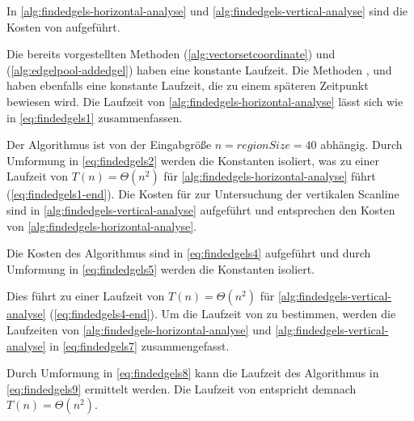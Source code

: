 In \autoref{alg:findedgels-horizontal-analyse} und \autoref{alg:findedgels-vertical-analyse} sind die Kosten von
  aufgeführt.

Die bereits vorgestellten Methoden  (\autoref{alg:vectorsetcoordinate}) und
  (\autoref{alg:edgelpool-addedgel}) haben eine konstante Laufzeit. Die Methoden
 ,  und  haben ebenfalls eine
 konstante Laufzeit, die zu einem späteren Zeitpunkt bewiesen wird.  Die Laufzeit von
 \autoref{alg:findedgels-horizontal-analyse} lässt sich wie in \autoref{eq:findedgels1} zusammenfassen.

Der Algorithmus ist von der Eingabgröße $n = \mathit{regionSize} = 40$ abhängig. Durch Umformung in \autoref{eq:findedgels2} werden die Konstanten isoliert, was zu einer Laufzeit von $T(n) = \Theta(n^2)$ für \autoref{alg:findedgels-horizontal-analyse}
 führt (\autoref{eq:findedgels1-end}). Die Kosten für  zur Untersuchung der vertikalen Scanline
 sind in \autoref{alg:findedgels-vertical-analyse} aufgeführt und entsprechen den Kosten von
 \autoref{alg:findedgels-horizontal-analyse}.

Die Kosten des Algorithmus sind in \autoref{eq:findedgels4} aufgeführt und durch Umformung in \autoref{eq:findedgels5}
 werden die Konstanten isoliert.

Dies führt zu einer Laufzeit von $T(n) = \Theta(n^2)$ für \autoref{alg:findedgels-vertical-analyse}
 (\autoref{eq:findedgels4-end}).
Um die Laufzeit von  zu bestimmen, werden die Laufzeiten von
 \autoref{alg:findedgels-horizontal-analyse} und \autoref{alg:findedgels-vertical-analyse} in \autoref{eq:findedgels7}
 zusammengefasst.

Durch Umformung in \autoref{eq:findedgels8} kann die Laufzeit des Algorithmus in \autoref{eq:findedgels9} ermittelt
 werden. Die Laufzeit von  entspricht demnach $T(n) = \Theta(n^2)$.

